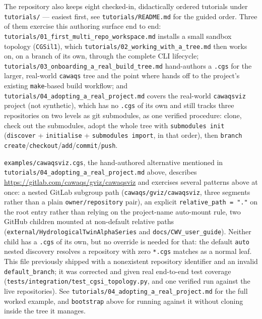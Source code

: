 The repository also keeps eight checked-in, didactically ordered tutorials
under \texttt{tutorials/} --- easiest first, see
\texttt{tutorials/README.md} for the guided order. Three of them exercise
this authoring surface end to end:
\texttt{tutorials/01\_first\_multi\_repo\_workspace.md} installs a small
sandbox topology (\texttt{CGSil1}), which
\texttt{tutorials/02\_working\_with\_a\_tree.md} then works on, on a branch
of its own, through the complete CLI lifecycle;
\texttt{tutorials/03\_onboarding\_a\_real\_build\_tree.md} hand-authors
a \texttt{.cgs} for the larger, real-world \texttt{cawaqs} tree and the
point where \cgscli{} hands off to the project's existing
\texttt{make}-based build workflow; and
\texttt{tutorials/04\_adopting\_a\_real\_project.md} covers the
real-world \texttt{cawaqsviz} project (not synthetic), which has no
\texttt{.cgs} of its own and still tracks three repositories on two levels
as git submodules,
as one verified procedure: clone, check out the submodules, adopt the whole
tree with \texttt{submodules init} (\texttt{discover} +
\texttt{initialise} + \texttt{submodules import}, in that order), then
\texttt{branch create}/\texttt{checkout}/\texttt{add}/\texttt{commit}/\texttt{push}.

\texttt{examples/cawaqsviz.cgs}, the hand-authored alternative mentioned in
\texttt{tutorials/04\_adopting\_a\_real\_project.md} above,
describes \url{https://gitlab.com/cawaqs/gviz/cawaqsviz} and exercises
several patterns above at once: a nested GitLab subgroup path
(\texttt{cawaqs/gviz/cawaqsviz}, three segments rather than a plain
\texttt{owner/repository} pair), an explicit \texttt{relative\_path = "."}
on the root entry rather than relying on the project-name auto-mount rule,
two GitHub children mounted at non-default relative paths
(\texttt{external/HydrologicalTwinAlphaSeries} and
\texttt{docs/CWV\_user\_guide}). Neither child has a \texttt{.cgs} of its
own, but no override is needed for that: the default \texttt{auto} nested
discovery resolves a repository with zero \texttt{*.cgs} matches as a
normal leaf.
This file previously shipped with a nonexistent repository identifier and
an invalid \texttt{default\_branch}; it was corrected and given real
end-to-end test coverage
(\texttt{tests/integration/test\_cgsi\_topology.py}, and one verified run
against the live repositories).
See \texttt{tutorials/04\_adopting\_a\_real\_project.md}
for the full worked example, and \texttt{bootstrap} above for running
\cgspkg{} against it without cloning \cgspkg{} inside the tree it manages.

